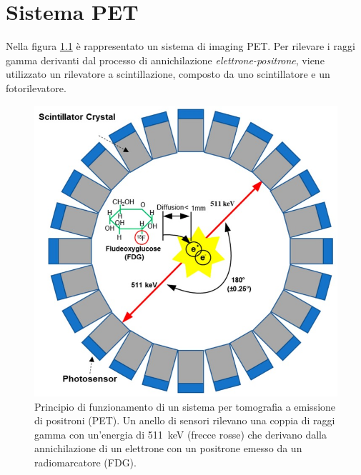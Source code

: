 \chapter{Sistema PET}
Nella figura \ref{fig:PET_imaging_system} è rappresentato un sistema di imaging PET. Per rilevare i raggi gamma derivanti dal processo di annichilazione \textit{elettrone-positrone}, viene utilizzato un rilevatore a scintillazione, composto da uno scintillatore e un fotorilevatore. 
\begin{figure}[h]
	\centering
	\includegraphics[width=0.45\linewidth]{./ImageFiles/PET_imaging_system}
	\caption{Principio di funzionamento di un sistema per tomografia a emissione di positroni (PET). Un anello di sensori rilevano una coppia di raggi gamma con un'energia di \SI{511}{\kilo\electronvolt} (frecce rosse) che derivano dalla annichilazione di un elettrone con un positrone emesso da un radiomarcatore (FDG)\cite{Jiang2019}.}
	\label{fig:PET_imaging_system}
\end{figure}


